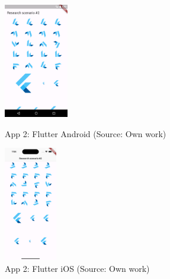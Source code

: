 \begin{figure}[H]
\begin{minipage}{.47\textwidth}
  \centering
  \includegraphics[height=50mm]{img/app2_flutter_android}
  \caption{App 2: Flutter Android (Source: Own work)}
  \label{fig:app2_flutter_android}
\end{minipage}
\hfill
\begin{minipage}{.47\textwidth}
  \centering
  \includegraphics[height=50mm]{img/app2_flutter_ios}
  \caption{App 2: Flutter iOS (Source: Own work)}
  \label{fig:app2_flutter_ios}
\end{minipage}
\end{figure}


